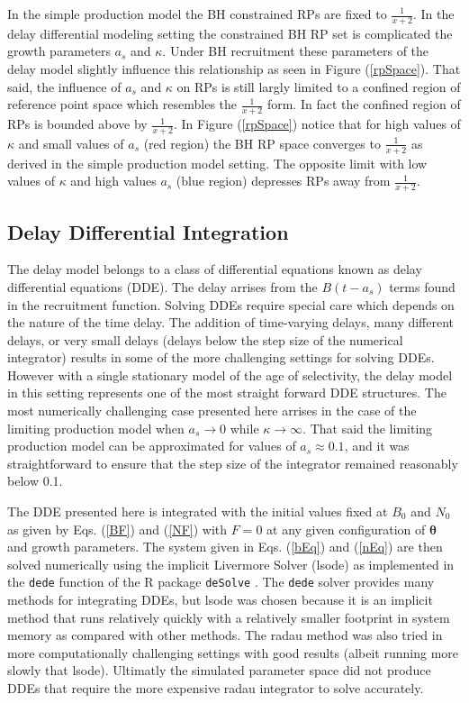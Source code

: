 %
In the simple production model the BH constrained RPs are fixed to $\frac{1}{x+2}$.
In the delay differential modeling setting the constrained BH RP set is 
complicated the growth parameters $a_s$ and $\kappa$.
Under BH recruitment these parameters of the delay model slightly %
influence this relationship as seen in Figure (\ref{rpSpace}). That said, 
the influence of $a_s$ and $\kappa$ on RPs is still largly limited to a 
confined region of reference point space which resembles the $\frac{1}{x+2}$ 
form. In fact the confined region of RPs is bounded above by $\frac{1}{x+2}$. %
In Figure (\ref{rpSpace}) notice that for high values of $\kappa$ and small 
values of $a_s$ (red region) the BH RP space converges to $\frac{1}{x+2}$ as 
derived in the simple production model setting. The opposite limit with low 
values of $\kappa$ and high values $a_s$ (blue region) depresses RPs away from 
$\frac{1}{x+2}$. 

%
\subsection{Delay Differential Integration}

%
The delay model belongs to a class of differential equations known as delay 
differential equations (DDE). The delay arrises from the $B(t-a_s)$ terms 
found in the recruitment function. Solving DDEs require special care which 
depends on the nature of the time delay. The addition of time-varying delays, 
many different delays, or very small delays (delays below the step size of the 
numerical integrator) results in some of the more challenging settings for 
solving DDEs. However with a single stationary model of the age of selectivity, 
the delay model in this setting represents one of the most straight forward 
DDE structures. The most numerically challenging case presented here arrises 
in the case of the limiting production model when $a_s\to0$ while $\kappa\to\infty$. 
That said the limiting production model can be approximated for values of 
$a_s\approx0.1$, and it was straightforward to ensure that the step size of 
the integrator remained reasonably below 0.1. 

%
The DDE presented here is integrated with the initial values fixed at $B_0$ 
and $N_0$ as given by Eqs. (\ref{BF}) and (\ref{NF}) with $F=0$ at any given 
configuration of $\bm{\theta}$ and growth parameters. %
The system given in Eqs. (\ref{bEq}) and (\ref{nEq}) are then solved 
numerically using the implicit Livermore Solver (lsode) as implemented in the 
\verb|dede| function of the R package \verb|deSolve| . 
The \verb|dede| solver provides many methods for integrating DDEs, but lsode 
was chosen because it is an implicit method that runs relatively quickly with 
a relatively smaller footprint in system memory as compared with other methods. 
The radau method was also tried in more computationally challenging settings 
with good results (albeit running more slowly that lsode). Ultimatly the 
simulated parameter space did not produce DDEs that require the more expensive 
radau integrator to solve accurately.
 
